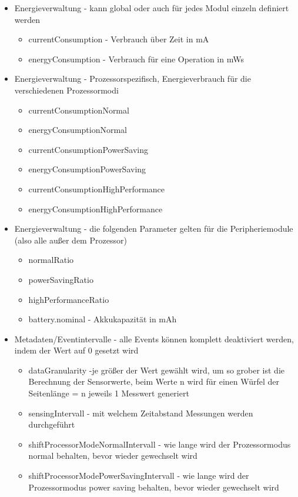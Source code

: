 \begin{itemize}
\item Energieverwaltung - kann global oder auch für jedes Modul einzeln definiert werden
\begin{itemize}
\item currentConsumption - Verbrauch über Zeit in mA
\item energyConsumption - Verbrauch für eine Operation in mWs
\end{itemize}
\item Energieverwaltung - Prozessorspezifisch, Energieverbrauch für die verschiedenen Prozessormodi
\begin{itemize}
\item currentConsumptionNormal
\item energyConsumptionNormal
\item currentConsumptionPowerSaving
\item energyConsumptionPowerSaving
\item currentConsumptionHighPerformance
\item energyConsumptionHighPerformance
\end{itemize}
\item Energieverwaltung - die folgenden Parameter gelten für die Peripheriemodule (also alle außer dem Prozessor)
\begin{itemize}
\item normalRatio
\item powerSavingRatio
\item highPerformanceRatio
\item battery.nominal - Akkukapazität in mAh
\end{itemize}
\item Metadaten/Eventintervalle - alle Events können komplett deaktiviert werden, indem der Wert auf 0 gesetzt wird
\begin{itemize}
\item dataGranularity -je größer der Wert gewählt wird, um so grober ist die Berechnung der Sensorwerte, beim Werte n wird für einen Würfel der Seitenlänge = n jeweils 1 Messwert generiert
\item sensingIntervall - mit welchem Zeitabstand Messungen werden durchgeführt
\item shiftProcessorModeNormalIntervall - wie lange wird der Prozessormodus normal behalten, bevor wieder gewechselt wird
\item shiftProcessorModePowerSavingIntervall - wie lange wird der Prozessormodus power saving behalten, bevor wieder gewechselt wird

\end{itemize}
\end{itemize}
